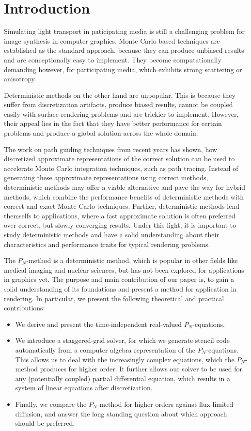 \section{Introduction}

Simulating light transport in paticipating media is still a challenging problem for image synthesis in computer graphics. Monte Carlo based techniques are established as the standard approach, because they can produce unbiased results and are conceptionally easy to implement. They become computationally demanding however, for participating media, which exhibits strong scattering or anisotropy.

Deterministic methods on the other hand are unpopular. This is because they suffer from discretization artifacts, produce biased results, cannot be coupled easily with surface rendering problems and are trickier to implement. However, their appeal lies in the fact that they have better performance for certain problems and produce a global solution across the whole domain.

The work on path guiding techniques from recent years has shown, how discretized approximate representations of the correct solution can be used to accelerate Monte Carlo integration techniques, such as path tracing. Instead of generating these approximate representations using correct methods, deterministic methods may offer a viable alternative and pave the way for hybrid methods, which combine the performance benefits of deterministic methods with correct and exact Monte Carlo techniques. Further, deterministic methods lend themselfs to applications, where a fast approximate solution is often preferred over correct, but slowly converging results. Under this light, it is important to study deterministic methods and have a solid understanding about their characteristics and performance traits for typical rendering problems.

The $P_N$-method is a deterministic method, which is popular in other fields like medical imaging and nuclear sciences, but has not been explored for applications in graphics yet. The purpose and main contribution of our paper is, to gain a solid understanding of its foundations and present a method for application in rendering. In particular, we present the following theoretical and practical contributions:
\begin{itemize}
	\item We derive and present the time-independent real-valued $P_N$-equations.
	\item We introduce a staggered-grid solver, for which we generate stencil code automatically from a computer algebra representation of the $P_N$-equations. This allows us to deal with the increasingly complex equations, which the $P_N$-method produces for higher order. It further allows our solver to be used for any (potentially coupled) partial differential equation, which results in a system of linear equations after discretization.
	\item Finally, we compare the $P_N$-method for higher orders against flux-limited diffusion, and answer the long standing question about which approach should be preferred.
\end{itemize}

